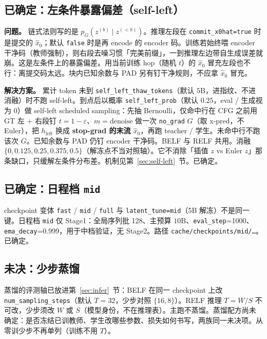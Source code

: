 \documentclass[UTF8,a4paper,11pt]{ctexart}
\begin{document}
\subsection{已确定：左条件暴露偏差（self-left）}

\textbf{问题。}
链式法则写的是 \(p_G(z^{(b)}\mid z^{(<b)})\)。推理左段在 \texttt{commit\_x0hat=true} 时是提交的 \(\hat x_0\)；默认 \texttt{false} 时是再 encode 的 encoder 码。训练若始终喂 encoder 干净码（教师强制），则右段去噪习惯「完美前缀」，一到推理左边带自生成误差就崩。这是左条件上的暴露偏差。用当前训练 hop（随机 \(t\)）的 \(\hat x_0\) 冒充左段也不行：离提交码太远。块内已知余数与 PAD 另有钉干净规则，不应拿 \(\hat x_0\) 冒充。

\textbf{解决方案。}
累计 token 未到 \texttt{self\_left\_thaw\_tokens}（默认 \(5\mathrm{B}\)，进指纹、不进消融）时不跑 self-left。到点后以概率 \texttt{self\_left\_prob}（默认 \(0.25\)，eval / 生成视为 0）做 self-left scheduled sampling：先抽 Bernoulli，仅命中行在 CFG 之前用 GT 左 + 右段钉 \(t=1-\varepsilon\)、\(m=\mathrm{denoise}\) 做一次 \texttt{no\_grad} \(G\)（取 x-pred，不 Euler），把 \(h_{\mathrm{left}}\) 换成 \textbf{stop-grad 的末流 \(\hat x_0\)}，再跑 teacher / 学生。未命中行不跑该次 \(G\)。已知余数与 PAD 仍钉 encoder 干净码。BELF 与 RELF 共用。消融 \(\{0,0.125,0.25,0.375,0.5\}\)（解冻点不当对照轴）。它不消除「插值 \(z\) vs Euler \(z\)」那条缺口，只缓解左条件分布差。机制见第~\ref{sec:self-left}~节。已确定。

\subsection{已确定：日程档 \texttt{mid}}

checkpoint 变体 \texttt{fast} / \texttt{mid} / \texttt{full} 与 \texttt{latent\_tune=mid}（5B 解冻）不是同一键。日程档 \texttt{mid} 仅 Stage1：全局序列批 128、主预算 \(10\mathrm{B}\)、\texttt{eval\_step}=1000、\texttt{ema\_decay}=0.999，用于中档验证，无 Stage2。路径 \texttt{cache/checkpoints/mid/\ldots}。已确定。

\subsection{未决：少步蒸馏}

蒸馏的评测轴已放进第~\ref{sec:infer}~节：BELF 在同一 checkpoint 上改 \texttt{num\_sampling\_steps}（默认 \(T=32\)，少步对照 \(\{16,8\}\)）。RELF 推理 \(T=W/S\) 不可改，少步须改 \(W\) 或 \(S\)（模型身份，不在推理表）。主跑不蒸馏。蒸馏配方尚未确定：是否冻结已训教师、学生改哪些参数、损失如何书写，两族同一未决项。从零训少步不再单列（训练不用 \(T\)）。
\end{document}
